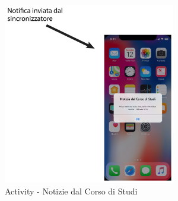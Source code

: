 \begin{figure}
	\centering
	\includegraphics[width=0.67\textwidth]{imgs/gruppo2/activity-notifiche-notizie-corso-di-studi}
	\caption{Activity - Notizie dal Corso di Studi}
	\label{fig:activity-notifiche-notizie-corso-di-studi}
\end{figure}

\clearpage